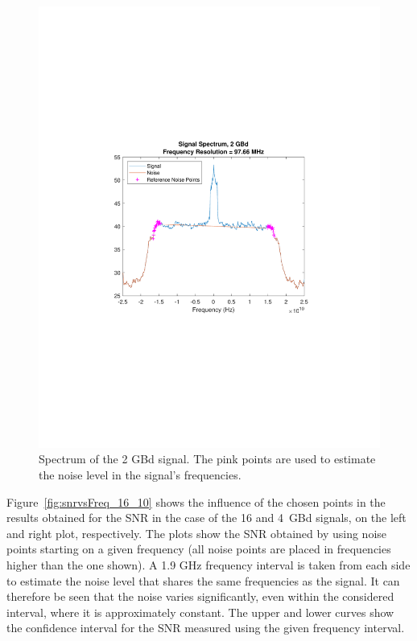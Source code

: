 \begin{refsection}
\begin{figure}[H]
\begin{minipage}{0.43\textwidth}
	\end{minipage}
	\begin{minipage}{0.43\textwidth}
		\centering
		\includegraphics[clip, trim=4cm 8cm 4cm 8cm, 
		width=1\textwidth]{./sdf/m_qam_system/figures/snr/minMaxSpec/2GBdMaxSpecHSNR.pdf}
		\subcaption{\label{fig:snrMaxFreq_2_10_500}}
	\end{minipage}
	\caption{Spectrum of the 2 GBd signal. The pink points are used to 
		estimate the noise level in the signal's 
		frequencies.\label{fig:snrSpec_2_10_500}}
\end{figure}

Figure~\ref{fig:snrvsFreq_16_10} shows the influence of the chosen points in 
the results obtained for the SNR in the case of the 16 and 4~GBd signals, on 
the left and right plot, respectively. The 
plots show the SNR obtained by using noise points starting on a given frequency 
(all noise points are placed in frequencies higher than the one shown). A 1.9 
GHz frequency interval is taken from each side to estimate the noise level that 
shares the same frequencies as the signal. It can therefore be seen that the 
noise varies significantly, even within the considered interval, where it is 
approximately constant. The upper and lower curves show the confidence interval 
for the SNR measured using the given frequency interval.



\end{refsection}
